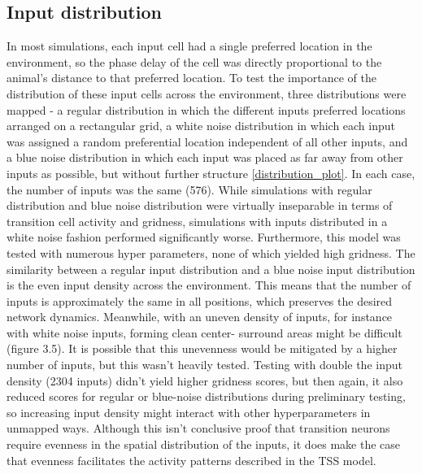 \documentclass{article}
\begin{document}
    \subsection{Input distribution}
    In most simulations, each input cell had a single preferred location in the environment, so the phase delay of the cell was directly proportional to the animal's distance to that preferred location. To test the importance of the distribution of these input cells across the environment, three distributions were mapped - a regular distribution in which the different inputs preferred locations arranged on a rectangular grid, a white noise distribution in which each input was assigned a random preferential location independent of all other inputs, and a blue noise distribution in which each input was placed as far away from other inputs as possible, but without further structure \ref{distribution_plot}. In each case, the number of inputs was the same (576).
    While simulations with regular distribution and blue noise distribution were virtually inseparable in terms of transition cell activity and gridness, simulations with inputs distributed in a white noise fashion performed significantly worse. Furthermore, this model was tested with numerous hyper parameters, none of which yielded high gridness.
    The similarity between a regular input distribution and a blue noise input distribution is the even input density across the environment. This means that the number of inputs is approximately the same in all positions, which preserves the desired network dynamics. Meanwhile, with an uneven density of inputs, for instance with white noise inputs, forming clean center- surround areas might be difficult (figure 3.5). It is possible that this unevenness would be mitigated by a higher number of inputs, but this wasn't heavily tested. Testing with double the input density (2304 inputs) didn't yield higher gridness scores, but then again, it also reduced scores for regular or blue-noise distributions during preliminary testing, so increasing input density might interact with other hyperparameters in unmapped ways.
    Although this isn't conclusive proof that transition neurons require evenness in the spatial distribution of the inputs, it does make the case that evenness facilitates the activity patterns described in the TSS model.
\end{document}
